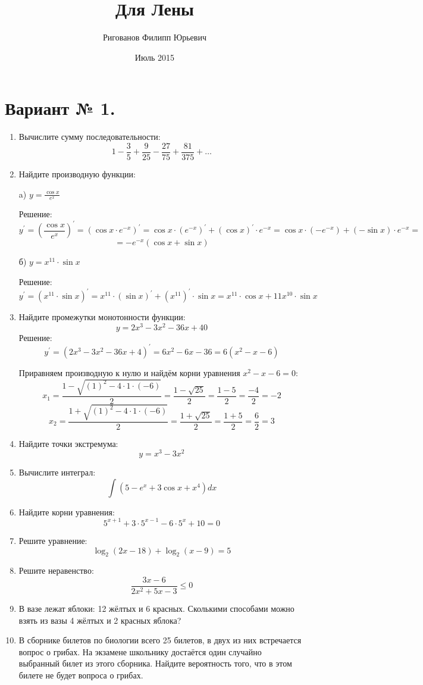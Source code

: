 \documentclass{article}
\title{Для Лены}
\author{Ригованов Филипп Юрьевич}
\date{Июль 2015}
\begin{document}
\maketitle
\section*{Вариант № 1.}
\begin{enumerate}

\item %
Вычислите сумму последовательности:
$$1-\frac{3}{5}+\frac{9}{25}-\frac{27}{75}+\frac{81}{375}+\ldots$$
\item %
Найдите производную функции:

a) $y=\frac{\cos{x}}{e^x}$

Решение:
$$y^\prime=\left(\frac{\cos{x}}{e^x}\right)^\prime=\left(\cos{x}\cdot e^{-x}\right)^\prime=\cos{x}\cdot\left(e^{-x}\right)^\prime+\left(\cos{x}\right)^\prime\cdot e^{-x}=\cos{x}\cdot\left(-e^{-x}\right)+\left(-\sin{x}\right)\cdot e^{-x}=$$ $$=-e^{-x}\left(\cos{x}+\sin{x}\right)$$

б) $y=x^{11}\cdot\sin{x}$

Решение:
$$y^\prime=\left(x^{11}\cdot\sin{x}\right)^\prime=x^{11}\cdot\left(\sin{x}\right)^\prime+\left(x^{11}\right)^\prime\cdot\sin{x}=x^{11}\cdot\cos{x}+11x^{10}\cdot\sin{x}$$

\item %
Найдите промежутки монотонности функции:
$$y=2x^3-3x^2-36x+40$$
Решение:
$$y^\prime=\left(2x^3-3x^2-36x+4\right)^\prime=6x^2-6x-36=6\left(x^2-x-6\right)$$ %

Приравняем производную к нулю и найдём корни уравнения $x^2-x-6=0$:
$$x_1=\frac{1-\sqrt{(1)^2-4\cdot1\cdot(-6)}}{2}=\frac{1-\sqrt{25}}{2}=\frac{1-5}{2}=\frac{-4}{2}=-2$$
$$x_2=\frac{1+\sqrt{(1)^2-4\cdot1\cdot(-6)}}{2}=\frac{1+\sqrt{25}}{2}=\frac{1+5}{2}=\frac{6}{2}=3$$

\item %
Найдите точки экстремума:
$$y=x^3-3x^2$$

\item %
Вычислите интеграл:
$$\int{\left(5-e^x+3\cos{x}+x^4\right)dx}$$

\item %
Найдите корни уравнения:
$$5^{x+1}+3\cdot5^{x-1}-6\cdot5^x+10=0$$

\item %
Решите уравнение:
$$\log_2{(2x-18)}+\log_2{(x-9)}=5$$

\item %
Решите неравенство:
$$\frac{3x-6}{2x^2+5x-3}\leq0$$

\item %
В вазе лежат яблоки: 12 жёлтых и 6 красных. Сколькими способами можно взять из вазы 4 жёлтых и 2 красных яблока?

\item %
В сборнике билетов по биологии всего 25 билетов, в двух из них встречается вопрос о грибах. На экзамене школьнику достаётся один случайно выбранный билет из этого сборника. Найдите вероятность того, что в этом билете не будет вопроса о грибах.

\end{enumerate}
\end{document}
